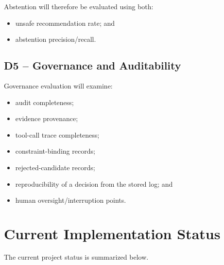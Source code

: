 \documentclass[12pt,a4paper]{article}
\begin{document}
Abstention will therefore be evaluated using both:
\begin{itemize}
    \item unsafe recommendation rate; and
    \item abstention precision/recall.
\end{itemize}

\subsection{D5 -- Governance and Auditability}

Governance evaluation will examine:
\begin{itemize}
    \item audit completeness;
    \item evidence provenance;
    \item tool-call trace completeness;
    \item constraint-binding records;
    \item rejected-candidate records;
    \item reproducibility of a decision from the stored log; and
    \item human oversight/interruption points.
\end{itemize}

\section{Current Implementation Status}
\label{sec:status}

The current project status is summarized below.
\end{document}
